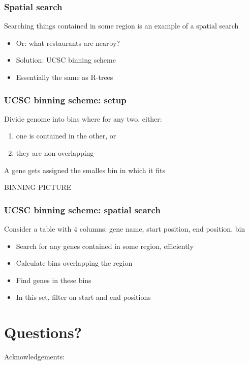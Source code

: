 \documentclass[slidestop]{beamer}
\begin{document}
\begin{frame}
  \frametitle{Spatial search}
  Searching things contained in some region is an example of a spatial search
  \begin{itemize}
    \item Or: what restaurants are nearby?
    \item Solution: UCSC binning scheme
    \item Essentially the same as R-trees
  \end{itemize}
\end{frame}

\begin{frame}
  \frametitle{UCSC binning scheme: setup}
  Divide genome into bins where for any two, either:
  \begin{enumerate}
    \item one is contained in the other, or
    \item they are non-overlapping
  \end{enumerate}
  A gene gets assigned the smalles bin in which it fits

  BINNING PICTURE
\end{frame}

\begin{frame}
  \frametitle{UCSC binning scheme: spatial search}
  Consider a table with 4 columns: gene name, start position, end position, bin
  \begin{itemize}
    \item Search for any genes contained in some region, efficiently
    \item Calculate bins overlapping the region
    \item Find genes in these bins
    \item In this set, filter on start and end positions
  \end{itemize}
\end{frame}

\section{Questions?}
\lastpagetemplate
\begin{frame}
  \begin{center}
    Acknowledgements:
    \bigskip
    \bigskip

  \end{center}
\end{frame}
\end{document}
